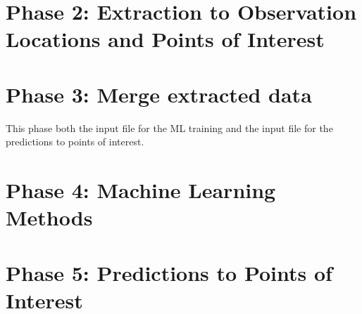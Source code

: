\documentclass[letterpaper,12pt]{article}
\begin{document}









\pagebreak
\section{Phase 2: Extraction to Observation Locations and Points of Interest}


\pagebreak
\section{Phase 3: Merge extracted data}

This phase both the input file for the ML training and the input file for the predictions to points of interest.



\pagebreak
\section{Phase 4: Machine Learning Methods} 



\pagebreak
\section{Phase 5: Predictions to Points of Interest} 




%


%

\end{document}

